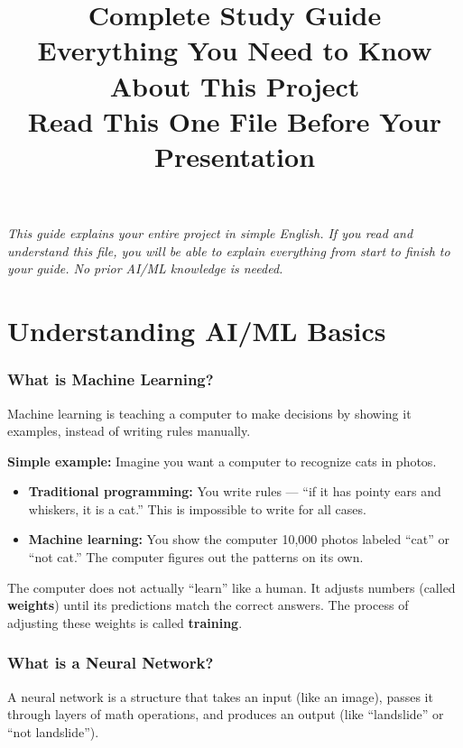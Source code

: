\documentclass[11pt]{article}
\title{Complete Study Guide \\ \large Everything You Need to Know About This Project \\ \normalsize Read This One File Before Your Presentation}
\author{}
\date{}
\begin{document}
\maketitle

\noindent \textit{This guide explains your entire project in simple English. If you read and understand this file, you will be able to explain everything from start to finish to your guide. No prior AI/ML knowledge is needed.}

\tableofcontents
\newpage

\part{Understanding AI/ML Basics}

\section{What is Machine Learning?}

Machine learning is teaching a computer to make decisions by showing it examples, instead of writing rules manually.

\textbf{Simple example:} Imagine you want a computer to recognize cats in photos.
\begin{itemize}[noitemsep]
    \item \textbf{Traditional programming:} You write rules --- ``if it has pointy ears and whiskers, it is a cat.'' This is impossible to write for all cases.
    \item \textbf{Machine learning:} You show the computer 10,000 photos labeled ``cat'' or ``not cat.'' The computer figures out the patterns on its own.
\end{itemize}

The computer does not actually ``learn'' like a human. It adjusts numbers (called \textbf{weights}) until its predictions match the correct answers. The process of adjusting these weights is called \textbf{training}.

\section{What is a Neural Network?}

A neural network is a structure that takes an input (like an image), passes it through layers of math operations, and produces an output (like ``landslide'' or ``not landslide'').
\end{document}
